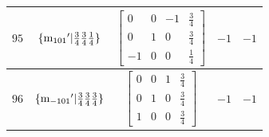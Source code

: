 \documentclass[fleqn,8pt]{jsarticle}
\begin{document}
\begin{longtable}{ccccc}
$ 95 $ & $ \{{\rm m}_{101}{}'|\frac{3}{4} \frac{3}{4} \frac{1}{4}\} $ & $ \begin{bmatrix} 0 & 0 & -1 & \frac{3}{4} \\ 0 & 1 & 0 & \frac{3}{4} \\ -1 & 0 & 0 & \frac{1}{4} \end{bmatrix} $ & $ -1 $ & $ -1 $ \\ \hline
$ 96 $ & $ \{{\rm m}_{-101}{}'|\frac{3}{4} \frac{3}{4} \frac{3}{4}\} $ & $ \begin{bmatrix} 0 & 0 & 1 & \frac{3}{4} \\ 0 & 1 & 0 & \frac{3}{4} \\ 1 & 0 & 0 & \frac{3}{4} \end{bmatrix} $ & $ -1 $ & $ -1 $ \\
\end{longtable}
\end{document}
